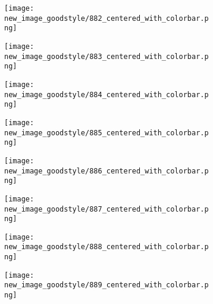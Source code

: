 \documentclass[a4paper,12pt]{article}
\begin{document}
\begin{figure}[H]
  \begin{subfigure}{0.11\textwidth}
    \texttt{[image: new\_image\_goodstyle/882\_centered\_with\_colorbar.png]}
  \end{subfigure}
  \hfill
  \begin{subfigure}{0.11\textwidth}
    \texttt{[image: new\_image\_goodstyle/883\_centered\_with\_colorbar.png]}
  \end{subfigure}
  \hfill
  \begin{subfigure}{0.11\textwidth}
    \texttt{[image: new\_image\_goodstyle/884\_centered\_with\_colorbar.png]}
  \end{subfigure}
  \hfill
  \begin{subfigure}{0.11\textwidth}
    \texttt{[image: new\_image\_goodstyle/885\_centered\_with\_colorbar.png]}
  \end{subfigure}
  \hfill
  \begin{subfigure}{0.11\textwidth}
    \texttt{[image: new\_image\_goodstyle/886\_centered\_with\_colorbar.png]}
  \end{subfigure}
  \hfill
  \begin{subfigure}{0.11\textwidth}
    \texttt{[image: new\_image\_goodstyle/887\_centered\_with\_colorbar.png]}
  \end{subfigure}
  \hfill
  \begin{subfigure}{0.11\textwidth}
    \texttt{[image: new\_image\_goodstyle/888\_centered\_with\_colorbar.png]}
  \end{subfigure}
  \hfill
  \begin{subfigure}{0.11\textwidth}
    \texttt{[image: new\_image\_goodstyle/889\_centered\_with\_colorbar.png]}
  \end{subfigure}
  \hfill
\end{figure}
\end{document}

